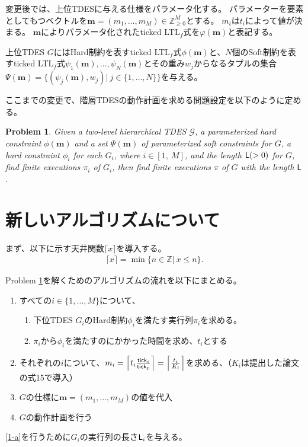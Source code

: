 \documentclass[ 10pt]{jsarticle}
\newtheorem{pbm}{Problem}
\newcommand{\tick}{{\sf tick}}
\newcommand{\Len}{{\sf L}}
\begin{document}
変更後では、上位TDESに与える仕様をパラメータ化する。
パラメーターを要素としてもつベクトルを$\bm{m}=(m_1,\ldots,m_M)\in\mathbb{Z}_{\geq 0}^M$とする。
$m_i$は$t_i$によって値が決まる。
$\bm{m}$によりパラメータ化されたticked LTL${}_f$式を$\varphi(\bm{m})$と表記する。

上位TDES $G$にはHard制約を表すticked LTL${}_f$式$\phi(\bm{m})$と、$N$個のSoft制約を表すticked LTL${}_f$式$\psi_1(\bm{m}),\ldots,\psi_N(\bm{m})$とその重み$w_j$からなるタプルの集合$\Psi(\bm{m})=\{(\psi_j(\bm{m}),w_j)|\ j\in\{1,\ldots,N\}\}$を与える。

ここまでの変更で、階層TDESの動作計画を求める問題設定を以下のように定める。
\begin{pbm}\label{pbm3}
Given a two-level hierarchical TDES $\mathcal{G}$, a parameterized hard constraint $\phi(\bm{m})$ and a set $\Psi(\bm{m})$ of parameterized soft constraints for $G$, a  hard constraint $\phi_i$ for each $G_i$, where $i \in [1,\ M]$, and the length $\Len(>0)$ for $G$, find finite executions $\pi_i$ of $G_i$, then find finite executions $\pi$ of $G$ with the length $\Len$.
%
\end{pbm}
%
%
%
\section{新しいアルゴリズムについて}\label{app}
%
まず、以下に示す天井関数$\lceil x \rceil$を導入する。
\begin{align}
\lceil x \rceil =\min\{n\in\mathbb{Z}|\ x\leq n\}.
\end{align}
%

Problem \ref{pbm3}を解くためのアルゴリズムの流れを以下にまとめる。
%
\begin{enumerate}
\item
すべての$i\in\{1,\ldots,M\}$について、
\begin{enumerate}
\item\label{1-a}
下位TDES $G_i$のHard制約$\phi_i$を満たす実行列$\pi_i$を求める。
\item\label{1-b}
$\pi_i$から$\phi_i$を満たすのにかかった時間を求め、$t_i$とする
\end{enumerate}
\item
それぞれの$i$について、$m_i=\left\lceil t_i\frac{\tick_i}{\tick_p} \right\rceil = \left\lceil \frac{t_i}{K_i}\right\rceil $を求める、（$K_i$は提出した論文の式15で導入）
\item
$G$の仕様に$\bm{m}=(m_1,\ldots,m_M)$の値を代入
\item
$G$の動作計画を行う
\end{enumerate}
%
\ref{1-a}を行うために$G_i$の実行列の長さ$\Len_i$を与える。
\end{document}
